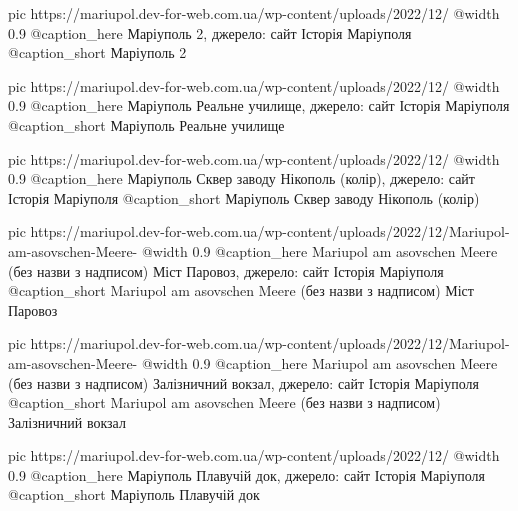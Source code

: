   pic https://mariupol.dev-for-web.com.ua/wp-content/uploads/2022/12/%
  @width 0.9
  @caption_here Маріуполь 2, джерело: сайт Історія Маріуполя
  @caption_short Маріуполь 2

  pic https://mariupol.dev-for-web.com.ua/wp-content/uploads/2022/12/%
  @width 0.9
  @caption_here Маріуполь Реальне училище, джерело: сайт Історія Маріуполя
  @caption_short Маріуполь Реальне училище

  pic https://mariupol.dev-for-web.com.ua/wp-content/uploads/2022/12/%
  @width 0.9
  @caption_here Маріуполь Сквер заводу Нікополь (колір), джерело: сайт Історія Маріуполя
  @caption_short Маріуполь Сквер заводу Нікополь (колір)

  pic https://mariupol.dev-for-web.com.ua/wp-content/uploads/2022/12/Mariupol-am-asovschen-Meere-%
  @width 0.9
  @caption_here Mariupol am asovschen Meere (без назви з надписом) Міст Паровоз, джерело: сайт Історія Маріуполя
  @caption_short Mariupol am asovschen Meere (без назви з надписом) Міст Паровоз

  pic https://mariupol.dev-for-web.com.ua/wp-content/uploads/2022/12/Mariupol-am-asovschen-Meere-%
  @width 0.9
  @caption_here Mariupol am asovschen Meere (без назви з надписом) Залізничний вокзал, джерело: сайт Історія Маріуполя
  @caption_short Mariupol am asovschen Meere (без назви з надписом) Залізничний вокзал

  pic https://mariupol.dev-for-web.com.ua/wp-content/uploads/2022/12/%
  @width 0.9
  @caption_here Маріуполь Плавучій док, джерело: сайт Історія Маріуполя
  @caption_short Маріуполь Плавучій док

